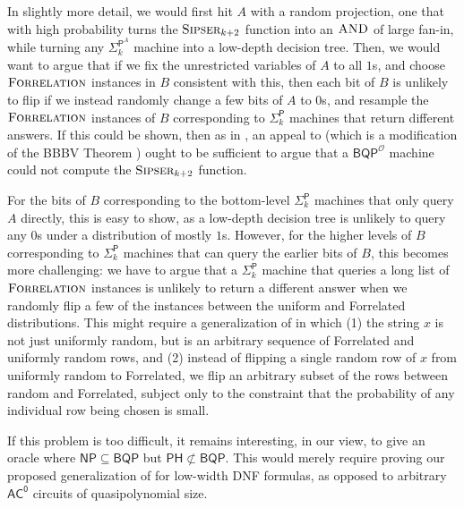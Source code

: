 \documentclass[10pt,a4paper]{article}
\newcommand{\Sipser}{\normalfont\textsc{Sipser}}
\newcommand{\AND}{\normalfont\textsc{AND}} %
\newcommand{\Forrelation}{\normalfont\textsc{Forrelation}}
\begin{document}
In slightly more detail, we would first hit $A$ with a random projection, one that with high probability turns the $\Sipser_{k+2}$ function into an $\AND$ of large fan-in, while turning any $\mathsf{\Sigma}_{k}^{\mathsf{P}^A}$ machine into a low-depth decision tree. Then, we would want to argue that if we fix the unrestricted variables of $A$ to all $1$s, and choose $\Forrelation$ instances in $B$ consistent with this, then each bit of $B$ is unlikely to flip if we instead randomly change a few bits of $A$ to $0$s, and resample the $\Forrelation$ instances of $B$ corresponding to $\mathsf{\Sigma}_{k}^{\mathsf{P}}$ machines that return different answers. If this could be shown, then as in , an appeal to  (which is a modification of the BBBV Theorem \cite{BBBV97}) ought to be sufficient to argue that a $\mathsf{BQP}^\mathcal{O}$ machine could not compute the $\Sipser_{k+2}$ function.

For the bits of $B$ corresponding to the bottom-level $\mathsf{\Sigma}_{k}^{\mathsf{P}}$ machines that only query $A$ directly, this is easy to show, as a low-depth decision tree is unlikely to query any $0$s under a distribution of mostly $1$s. However, for the higher levels of $B$ corresponding to $\mathsf{\Sigma}_{k}^{\mathsf{P}}$ machines that can query the earlier bits of $B$, this becomes more challenging: we have to argue that a $\mathsf{\Sigma}_{k}^{\mathsf{P}}$ machine that queries a long list of $\Forrelation$ instances is unlikely to return a different answer when we randomly flip a few of the instances between the uniform and Forrelated distributions. This might require a generalization of  in which (1) the string $x$ is not just uniformly random, but is an arbitrary sequence of Forrelated and uniformly random rows, and (2) instead of flipping a single random row of $x$ from uniformly random to Forrelated, we flip an arbitrary subset of the rows between random and Forrelated, subject only to the constraint that the probability of any individual row being chosen is small.

If this problem is too difficult, it remains interesting, in our view, to give an oracle where $\mathsf{NP} \subseteq \mathsf{BQP}$ but $\mathsf{PH} \not\subset \mathsf{BQP}$. This would merely require proving our proposed generalization of  for low-width DNF formulas, as opposed to arbitrary $\mathsf{AC^0}$ circuits of quasipolynomial size.
\end{document}
